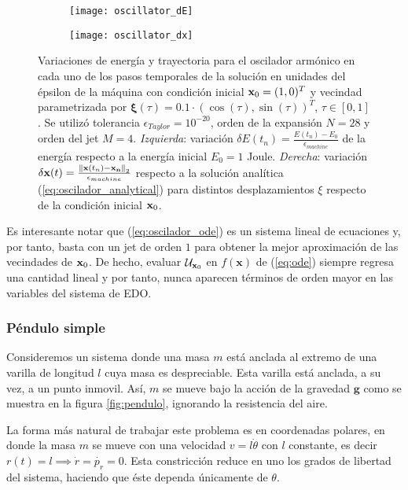 \begin{figure}[h!]
\centering
\begin{subfigure}{0.49\textwidth}
	\centering
	\texttt{[image: oscillator\_dE]}
	\label{fig:oscillator_dE}
\end{subfigure}
%
\begin{subfigure}{0.49\textwidth}
	\centering
	\texttt{[image: oscillator\_dx]}
	\caption{}
	\label{fig:oscillator_dx}
\end{subfigure}
\caption{Variaciones de energía y trayectoria para el oscilador armónico en cada uno de los pasos temporales de la solución en unidades del épsilon de la máquina con condición inicial $\mathbf{x}_0 = (1,0)^T$ y vecindad parametrizada por  $\mathbf{\xi}(\tau) = 0.1\cdot \left( \cos(\tau), \sin(\tau) \right)^T$, $\tau \in [0,1]$. Se utilizó tolerancia $\epsilon_{Taylor} = 10^{-20}$, orden de la expansión $N = 28$ y orden del jet $M=4$. \textit{Izquierda}: variación $\delta E(t_n) = \frac{E(t_n)-E_0}{\epsilon_{machine}}$ de la energía respecto a la energía inicial $E_0 = 1$ Joule. \textit{Derecha}: variación $\delta \mathbf{x}(t) =  \frac{\left\lVert\mathbf{x}(t_n) - \mathbf{x_n}\right\rVert_2}{\epsilon_{machine}}$ respecto a la solución analítica (\ref{eq:oscilador_analytical}) para distintos desplazamientos $\xi$ respecto de la condición inicial $\mathbf{x}_0$.}
\label{fig:oscillator_deltas}
\end{figure}

Es interesante notar que (\ref{eq:oscilador_ode}) es un sistema lineal de ecuaciones y, por tanto, basta con un jet de orden $1$ para obtener la mejor aproximación de las vecindades de $\mathbf{x}_0$. De hecho, evaluar $\mathcal{U}_{\mathbf{x}_0}$ en $f(\mathbf{x})$ de (\ref{eq:ode}) siempre regresa una cantidad lineal y por tanto, nunca aparecen términos de orden mayor en las variables del sistema de EDO.

\subsubsection{Péndulo simple}
\label{sec:pendulo}
Consideremos un sistema donde una masa $m$ está anclada al extremo de una varilla de longitud $l$ cuya masa es despreciable. Esta varilla está anclada, a su vez, a un punto inmovil. Así, $m$ se mueve bajo la acción de la gravedad $\mathbf{g}$ como se muestra en la figura \ref{fig:pendulo}, ignorando la resistencia del aire.



La forma más natural de trabajar este problema es en coordenadas polares, en donde la masa $m$ se mueve con una velocidad $v = l\dot{\theta}$ con $l$ constante, es decir $r(t) = l \implies \dot{r} = \dot{p_r} = 0$. Esta constricción reduce en uno los grados de libertad del sistema, haciendo que éste dependa únicamente de $\theta$. 

